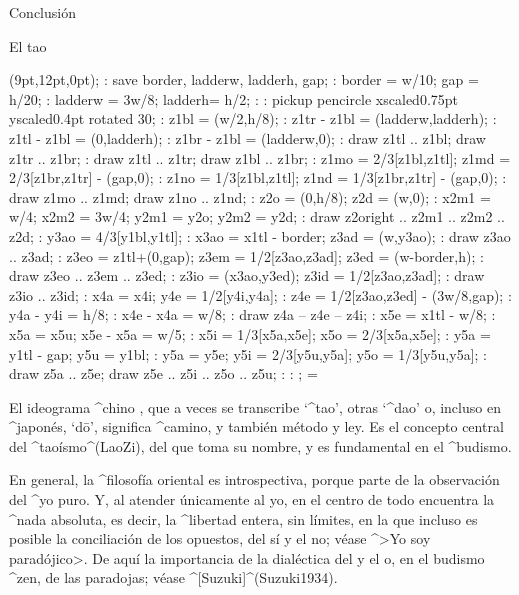 
\Part Conclusión

\Section El tao

\MTbeginchar(9pt,12pt,0pt);
 \MT: save border, ladderw, ladderh, gap;
 \MT: border = w/10; gap = h/20;
 \MT: ladderw = 3w/8; ladderh= h/2;
 \MT: %
 \MT: pickup pencircle xscaled0.75pt yscaled0.4pt rotated 30;
 \MT: z1bl = (w/2,h/8); %
 \MT: z1tr - z1bl = (ladderw,ladderh);
 \MT: z1tl - z1bl = (0,ladderh);
 \MT: z1br - z1bl = (ladderw,0);
 \MT: draw z1tl .. z1bl; draw z1tr .. z1br;
 \MT: draw z1tl .. z1tr; draw z1bl .. z1br;
 \MT: z1mo = 2/3[z1bl,z1tl]; z1md = 2/3[z1br,z1tr] - (gap,0);
 \MT: z1no = 1/3[z1bl,z1tl]; z1nd = 1/3[z1br,z1tr] - (gap,0);
 \MT: draw z1mo .. z1md; draw z1no .. z1nd;
 \MT: z2o = (0,h/8); z2d = (w,0); %
 \MT: x2m1 = w/4; x2m2 = 3w/4; y2m1 = y2o; y2m2 = y2d;
 \MT: draw z2o{right} .. z2m1 .. z2m2 .. z2d;
 \MT: y3ao = 4/3[y1bl,y1tl]; %
 \MT: x3ao = x1tl - border; z3ad = (w,y3ao);
 \MT: draw z3ao .. z3ad;
 \MT: z3eo = z1tl+(0,gap); z3em = 1/2[z3ao,z3ad]; z3ed = (w-border,h);
 \MT: draw z3eo .. z3em .. z3ed;
 \MT: z3io = (x3ao,y3ed); z3id = 1/2[z3ao,z3ad];
 \MT: draw z3io .. z3id;
 \MT: x4a = x4i; y4e = 1/2[y4i,y4a]; %
 \MT: z4e = 1/2[z3ao,z3ed] - (3w/8,gap);
 \MT: y4a - y4i = h/8; %
 \MT: x4e - x4a = w/8; %
 \MT: draw z4a -- z4e -- z4i;
 \MT: x5e = x1tl - w/8; %
 \MT: x5a = x5u; x5e - x5a = w/5; %
 \MT: x5i = 1/3[x5a,x5e]; x5o = 2/3[x5a,x5e];
 \MT: y5a = y1tl - gap; y5u = y1bl; %
 \MT: y5a = y5e; y5i = 2/3[y5u,y5a]; y5o = 1/3[y5u,y5a];
 \MT: draw z5a .. z5e; draw z5e .. z5i .. z5o .. z5u;
 \MT: %
 \MT: %
\MTendchar;
\newbox\taobox \setbox\taobox=\hbox{\raise-1.5pt\box\MTbox}
\def\tao{\copy\taobox}

El ideograma ^{chino} \tao, que a veces se transcribe `^{tao}', otras
`^{dao}' o, incluso en ^{japonés}, `d\=o', significa ^{camino}, y
también método y ley. Es el concepto central del ^{taoísmo}^(LaoZi), del
que toma su nombre, y es fundamental en el ^{budismo}.

En general, la ^{filosofía} oriental es introspectiva, porque parte de
la observación del ^{yo} puro. Y, al atender únicamente al yo, en el
centro de todo encuentra la ^{nada} absoluta, es decir, la ^{libertad}
entera, sin límites, en la que incluso es posible la conciliación de los
opuestos, del sí y el no; véase ^>Yo soy paradójico>. De aquí la
importancia de la dialéctica del  y el  o, en el
budismo ^{zen}, de las paradojas; véase ^[Suzuki]^(Suzuki1934).

